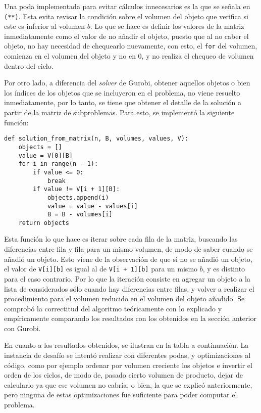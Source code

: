 \documentclass[letterpaper,10pt]{article}
\begin{document}
  Una poda implementada para evitar cálculos innecesarios es la que se señala en \texttt{(**)}. Esta evita revisar la condición sobre el volumen del objeto que verifica si este es inferior al volumen $b$. Lo que se hace es definir los valores de la matriz inmediatamente como el valor de no añadir el objeto, puesto que al no caber el objeto, no hay necesidad de chequearlo nuevamente, con esto, el \texttt{for} del volumen, comienza en el volumen del objeto y no en 0, y no realiza el chequeo de volumen dentro del ciclo.

  Por otro lado, a diferencia del \textit{solver} de Gurobi, obtener aquellos objetos o bien los índices de los objetos que se incluyeron en el problema, no viene resuelto inmediatamente, por lo tanto, se tiene que obtener el detalle de la solución a partir de la matriz de subproblemas. Para esto, se implementó la siguiente función:
  
  \begin{lstlisting}[columns=fullflexible]
  def solution_from_matrix(n, B, volumes, values, V):
    objects = []
    value = V[0][B]
    for i in range(n - 1):
        if value <= 0:
            break
        if value != V[i + 1][B]:
            objects.append(i)
            value = value - values[i]
            B = B - volumes[i]
    return objects
  \end{lstlisting}
  
  Esta función lo que hace es iterar sobre cada fila de la matriz, buscando las diferencias entre fila y fila para un mismo volumen, de modo de saber cuando se añadió un objeto. Esto viene de la observación de que si no se añadió un objeto, el valor de \texttt{V[i][b]} es igual al de \texttt{V[i + 1][b]} para un mismo $b$, y es distinto para el caso contrario. Por lo que la iteración consiste en agregar un objeto a la lista de considerados sólo cuando hay diferencias entre filas, y volver a realizar el procedimiento para el volumen reducido en el volumen del objeto añadido. Se comprobó la correctitud del algoritmo teóricamente con lo explicado y empíricamente comparando los resultados con los obtenidos en la sección anterior con Gurobi.
  
  En cuanto a los resultados obtenidos, se ilustran en la tabla a continuación. La instancia de desafío se intentó realizar con diferentes podas, y optimizaciones al código, como por ejemplo ordenar por volumen creciente los objetos e invertir el orden de los ciclos, de modo de, pasado cierto volumen de producto, dejar de calcularlo ya que ese volumen no cabría, o bien, la que se explicó anteriormente, pero ninguna de estas optimizaciones fue suficiente para poder computar el problema.
  
\end{document}
